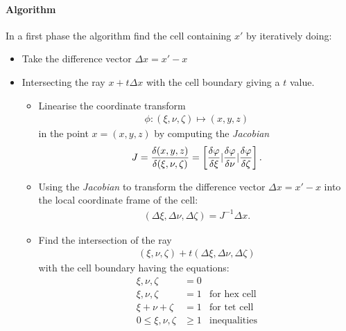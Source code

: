 \paragraph{Algorithm}
In a first phase the algorithm find the cell containing $x'$ by iteratively doing:
\begin{itemize}
    \item Take the difference vector $\Delta x = x'-x$
    \item Intersecting the ray $x+t \Delta x$ with the cell boundary giving a $t$ value.
        \begin{itemize}
            \item Linearise the coordinate transform 
                \begin{align*}
                    \phi: (\xi, \nu, \zeta)\mapsto (x,y,z)
                \end{align*}
                in the point $x=(x,y,z)$ by computing the \emph{Jacobian}
                \begin{align*}
                    J={\delta (x,y,z)\over \delta (\xi, \nu, \zeta)} = 
                        \left[
                            {\delta \phi\over \delta \xi} | {\delta \phi\over \delta \nu} | {\delta \phi\over \delta \zeta}
                        \right].
                \end{align*}
            \item Using the \emph{Jacobian} to transform the difference vector $\Delta x = x'-x$ into the local coordinate frame of the cell:
                \begin{align*}
                    (\Delta \xi, \Delta \nu, \Delta \zeta) = J^{-1} \Delta x.
                \end{align*}
            \item Find the intersection of the ray
                \begin{align*}
                    (\xi, \nu, \zeta) + t(\Delta \xi, \Delta \nu, \Delta \zeta)
                \end{align*}
                with the cell boundary having the equations:
                    \begin{align}
                         \xi, \nu, \zeta &= 0\\
                         \xi, \nu, \zeta &= 1 &\text{for hex cell}\\
                         \xi + \nu + \zeta &= 1 &\text{for tet cell}\\
                         0 \leq \xi, \nu, \zeta &\geq 1 &\text{inequalities}
                    \end{align}


\end{itemize}
\end{itemize}
